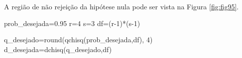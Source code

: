 \documentclass[
]{book}
\newenvironment{Shaded}{\begin{snugshade}}{\end{snugshade}}
\newcommand{\DecValTok}[1]{\textcolor[rgb]{0.00,0.00,0.81}{#1}}
\newcommand{\FloatTok}[1]{\textcolor[rgb]{0.00,0.00,0.81}{#1}}
\newcommand{\FunctionTok}[1]{\textcolor[rgb]{0.00,0.00,0.00}{#1}}
\newcommand{\NormalTok}[1]{#1}
\newcommand{\OtherTok}[1]{\textcolor[rgb]{0.56,0.35,0.01}{#1}}
\newcommand{\SpecialCharTok}[1]{\textcolor[rgb]{0.00,0.00,0.00}{#1}}
\begin{document}
\hfill\break

A região de não rejeição da hipótese nula pode ser vista na Figura \ref{fig:fig95}.

\hfill\break

\begin{Shaded}
\begin{Highlighting}[]
\NormalTok{prob\_desejada}\OtherTok{=}\FloatTok{0.95}
\NormalTok{r}\OtherTok{=}\DecValTok{4}
\NormalTok{s}\OtherTok{=}\DecValTok{3}
\NormalTok{df}\OtherTok{=}\NormalTok{(r}\DecValTok{{-}1}\NormalTok{)}\SpecialCharTok{*}\NormalTok{(s}\DecValTok{{-}1}\NormalTok{)}

\NormalTok{q\_desejado}\OtherTok{=}\FunctionTok{round}\NormalTok{(}\FunctionTok{qchisq}\NormalTok{(prob\_desejada,df), }\DecValTok{4}\NormalTok{)}
\NormalTok{d\_desejada}\OtherTok{=}\FunctionTok{dchisq}\NormalTok{(q\_desejado,df)}




\end{Highlighting}
\end{Shaded}
\end{document}

